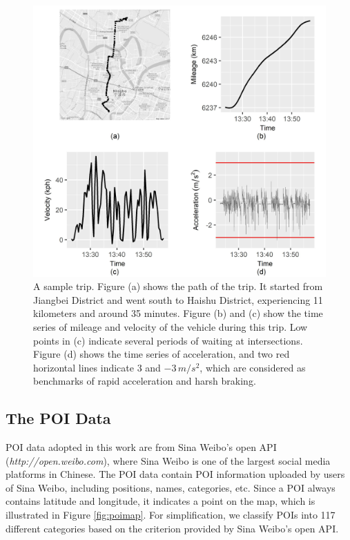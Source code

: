\documentclass[sii]{ipart}
\theoremstyle{plain}
\begin{document}
\begin{figure}[h!]
	\centering
	\includegraphics[width=0.7\linewidth]{trace}
	\caption[]{A sample trip. Figure (a) shows the path of the trip. It started from Jiangbei District and went south to Haishu District, experiencing 11 kilometers and around 35 minutes. Figure (b) and (c) show the time series of mileage and velocity of the vehicle during this trip. Low points in (c) indicate several periods of waiting at intersections. Figure (d) shows the time series of acceleration, and two red horizontal lines indicate $3$ and $-3 \, m/s^2$, which are considered as benchmarks of rapid acceleration and harsh braking. }
	\label{fig:path}
\end{figure}

\subsection{The POI Data}

POI data adopted in this work are from Sina Weibo's open API ({\it http://open.weibo.com}), where Sina Weibo is one of the largest social media platforms in Chinese. The POI data contain POI information uploaded by users of Sina Weibo, including positions, names, categories, etc. Since a POI always contains latitude and longitude, it indicates a point on the map, which is illustrated in Figure \ref{fig:poimap}.
For simplification, we classify POIs into 117 different categories based on the criterion provided by Sina Weibo's open API. 
\end{document}
